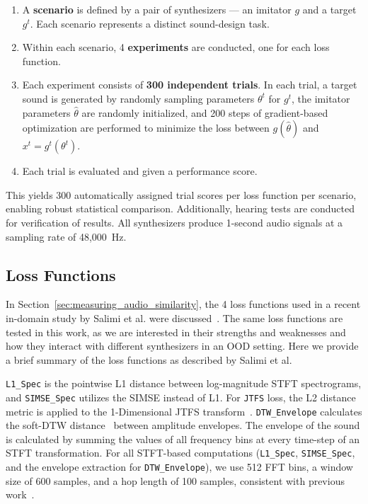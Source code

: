 \documentclass{article}
\newcommand{\anon}[1]{{#1}}
\newcommand{\SIMSESpec}{\texttt{SIMSE\_\allowbreak Spec}\xspace}
\newcommand{\LoneSpec}{\texttt{L1\_\allowbreak Spec}\xspace}
\newcommand{\JTFS}{\texttt{JTFS}\xspace}
\newcommand{\DTWEnv}{\texttt{DTW\_\allowbreak Envelope}\xspace}
\begin{document}
\begin{enumerate}
    \item A \textbf{scenario} is defined by a pair of synthesizers --- an imitator $g$ and a target $g^t$. Each scenario represents a distinct sound-design task.
    \item Within each scenario, 4 \textbf{experiments} are conducted, one for each loss function.
    \item Each experiment consists of \textbf{300 independent trials}. In each trial, a target sound is generated by randomly sampling parameters $\theta^t$ for $g^t$, the imitator parameters $\hat{\theta}$ are randomly initialized, and 200 steps of gradient-based optimization are performed to minimize the loss between $g(\hat{\theta})$ and $x^t = g^t(\theta^t)$.
    \item Each trial is evaluated and given a performance score.
\end{enumerate}

This yields 300 automatically assigned trial scores per loss function per scenario, enabling robust statistical comparison. Additionally, hearing tests are conducted for verification of results. All synthesizers produce 1-second audio signals at a sampling rate of 48{,}000~Hz.



\subsection{Loss Functions}
\label{subsec:loss_functions}
In Section~\ref{sec:measuring_audio_similarity}, the 4 loss functions used in \anon{a recent in-domain study} by \anon{Salimi et al.} were discussed~\cite{salimi2025evaluating}. The same loss functions are tested in this work, as we are interested in their strengths and weaknesses and how they interact with different synthesizers in an OOD setting. Here we provide a brief summary of the loss functions as described by \anon{Salimi et al.}

\LoneSpec is the pointwise L1 distance between log-magnitude STFT spectrograms, and \SIMSESpec utilizes the SIMSE instead of L1. For \JTFS loss, the L2 distance metric is applied to the 1-Dimensional JTFS transform~\cite{kymatio}. \DTWEnv calculates the soft-DTW  distance~\cite{softdtw_jax,cuturi2017soft} between amplitude envelopes. The envelope of the sound is calculated by summing the values of all frequency bins at every time-step of an STFT transformation. For all STFT-based computations (\LoneSpec, \SIMSESpec, and the envelope extraction for \DTWEnv), we use 512 FFT bins, a window size of 600 samples, and a hop length of 100 samples, consistent with previous work~\cite{salimi2025evaluating}.
\end{document}
